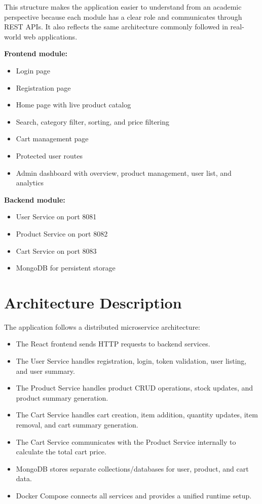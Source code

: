 \documentclass[12pt,a4paper]{article}
\begin{document}
This structure makes the application easier to understand from an academic perspective because each module has a clear role and communicates through REST APIs. It also reflects the same architecture commonly followed in real-world web applications.

\textbf{Frontend module:}
\begin{itemize}[leftmargin=1.5cm]
    \item Login page
    \item Registration page
    \item Home page with live product catalog
    \item Search, category filter, sorting, and price filtering
    \item Cart management page
    \item Protected user routes
    \item Admin dashboard with overview, product management, user list, and analytics
\end{itemize}

\textbf{Backend module:}
\begin{itemize}[leftmargin=1.5cm]
    \item User Service on port 8081
    \item Product Service on port 8082
    \item Cart Service on port 8083
    \item MongoDB for persistent storage
\end{itemize}

\section{Architecture Description}
The application follows a distributed microservice architecture:
\begin{itemize}[leftmargin=1.5cm]
    \item The React frontend sends HTTP requests to backend services.
    \item The User Service handles registration, login, token validation, user listing, and user summary.
    \item The Product Service handles product CRUD operations, stock updates, and product summary generation.
    \item The Cart Service handles cart creation, item addition, quantity updates, item removal, and cart summary generation.
    \item The Cart Service communicates with the Product Service internally to calculate the total cart price.
    \item MongoDB stores separate collections/databases for user, product, and cart data.
    \item Docker Compose connects all services and provides a unified runtime setup.
\end{itemize}
\end{document}
